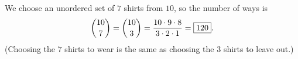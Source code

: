 We choose an unordered set of $7$ shirts from $10$, so the number of ways is
\[
\dbinom{10}{7}=\dbinom{10}{3}=\dfrac{10\cdot9\cdot8}{3\cdot2\cdot1}=\boxed{120}.
\]
(Choosing the $7$ shirts to wear is the same as choosing the $3$ shirts to leave out.)
